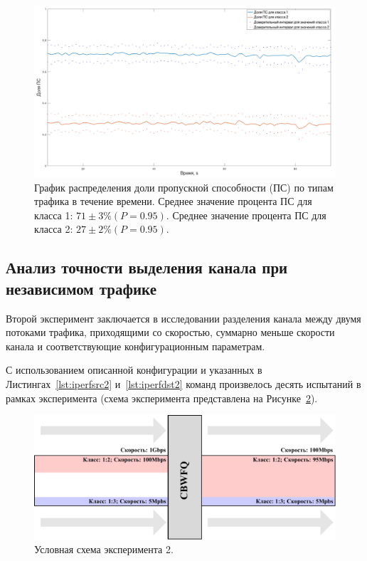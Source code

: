             \begin{figure}[ht!]
            	\center
            	\includegraphics[width=0.9\linewidth]{./plotc.png} %
            	\caption{График распределения доли пропускной способности (ПС) по типам трафика в течение времени.
						 Среднее значение процента ПС для класса 1: $71 \pm 3 \% (P = 0.95)$.
                         Среднее значение процента ПС для класса 2: $27 \pm 2 \% (P = 0.95)$.
                        }
    			\label{pic:plot}
            \end{figure}

		\subsection{Анализ точности выделения канала при независимом трафике}

			Второй эксперимент заключается в исследовании разделения канала между
			двумя потоками трафика, приходящими со скоростью, суммарно меньше
			скорости канала и соответствующие конфигурационным параметрам.

    		С использованием описанной конфигурации и указанных в Листингах~\ref{lst:iperfsrc2} и~\ref{lst:iperfdst2}
			команд произвелось десять испытаний в рамках эксперимента (схема
			эксперимента представлена на Рисунке~\ref{pic:exp2}).

		\begin{figure}[ht!]
			\center
			\includegraphics[scale=0.9]{./pdfimages/exp_scheme2.pdf}
			\caption{Условная схема эксперимента 2.}
			\label{pic:exp2}
		\end{figure}

